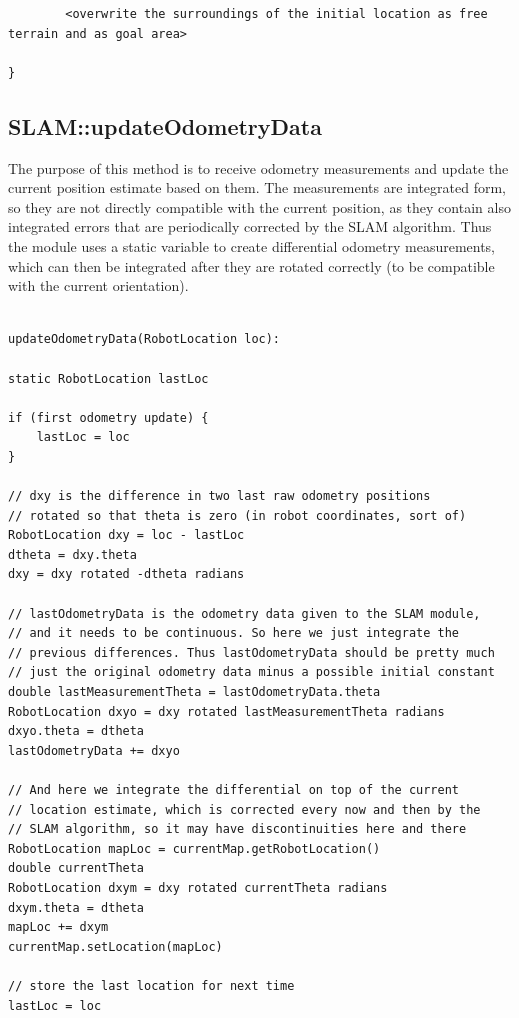 \documentclass[a4paper,10pt]{article}
\begin{document}
\begin{appendices}
\begin{verbatim}
    	<overwrite the surroundings of the initial location as free terrain and as goal area>

}    
\end{verbatim}

\subsection{SLAM::updateOdometryData}

The purpose of this method is to receive odometry measurements and update the current position estimate based on them. The measurements are integrated form, so they are not directly compatible with the current position, as they contain also integrated errors that are periodically corrected by the SLAM algorithm. Thus the module uses a static variable to create differential odometry measurements, which can then be integrated after they are rotated correctly (to be compatible with the current orientation).

\begin{verbatim}

updateOdometryData(RobotLocation loc):

static RobotLocation lastLoc

if (first odometry update) {
	lastLoc = loc
}

// dxy is the difference in two last raw odometry positions
// rotated so that theta is zero (in robot coordinates, sort of)
RobotLocation dxy = loc - lastLoc
dtheta = dxy.theta
dxy = dxy rotated -dtheta radians

// lastOdometryData is the odometry data given to the SLAM module, 
// and it needs to be continuous. So here we just integrate the 
// previous differences. Thus lastOdometryData should be pretty much 
// just the original odometry data minus a possible initial constant
double lastMeasurementTheta = lastOdometryData.theta
RobotLocation dxyo = dxy rotated lastMeasurementTheta radians 
dxyo.theta = dtheta
lastOdometryData += dxyo

// And here we integrate the differential on top of the current 
// location estimate, which is corrected every now and then by the 
// SLAM algorithm, so it may have discontinuities here and there
RobotLocation mapLoc = currentMap.getRobotLocation()
double currentTheta
RobotLocation dxym = dxy rotated currentTheta radians
dxym.theta = dtheta
mapLoc += dxym
currentMap.setLocation(mapLoc)

// store the last location for next time
lastLoc = loc


\end{verbatim}
\end{appendices}
\end{document}
